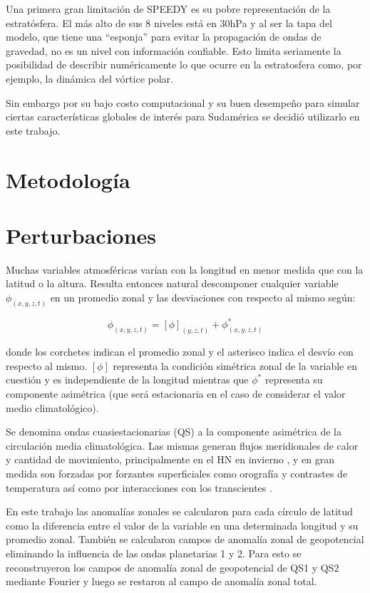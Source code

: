\documentclass[spanish,a4paper,12pt,oneside]{book}
\begin{document}
Una primera gran limitación de SPEEDY es su pobre representación de la
estratósfera. El más alto de sus 8 niveles está en 30hPa y al ser la
tapa del modelo, que tiene una ``esponja'' para evitar la propagación de
ondas de gravedad, no es un nivel con información confiable. Esto limita
seriamente la posibilidad de describir numéricamente lo que ocurre en la
estratosfera como, por ejemplo, la dinámica del vórtice polar.

Sin embargo por su bajo costo computacional y su buen desempeño para
simular ciertas características globales de interés para Sudamérica
\citep{Barreiro2014} se decidió utilizarlo en este trabajo.

\section{Metodología}\label{metodologia}

\section*{Perturbaciones}

Muchas variables atmosféricas varían con la longitud en menor medida que
con la latitud o la altura. Resulta entonces natural descomponer
cualquier variable \(\phi_{(x, y, z, t)}\) en un promedio zonal y las
desviaciones con respecto al mismo según:

\[
\phi_{(x, y, z, t)} = [\phi]_{(y, z, t)} + \phi_{(x, y, z, t)}^*
\]

donde los corchetes indican el promedio zonal y el asterisco indica el
desvío con respecto al mismo. \([\phi]\) representa la condición
simétrica zonal de la variable en cuestión y es independiente de la
longitud mientras que \(\phi^*\) representa su componente asimétrica
(que será estacionaria en el caso de considerar el valor medio
climatológico).

Se denomina ondas cuasiestacionarias (QS) a la componente asimétrica de
la circulación media climatológica. Las mismas generan flujos
meridionales de calor y cantidad de movimiento, principalmente en el HN
en invierno \citep{James}, y en gran medida son forzadas por forzantes
superficiales como orografía y contrastes de temperatura así como por
interacciones con los transcientes \citep{Rao2004}.

En este trabajo las anomalías zonales se calcularon para cada círculo de
latitud como la diferencia entre el valor de la variable en una
determinada longitud y su promedio zonal. También se calcularon campos
de anomalía zonal de geopotencial eliminando la influencia de las ondas
planetarias 1 y 2. Para esto se reconstruyeron los campos de anomalía
zonal de geopotencial de QS1 y QS2 mediante Fourier y luego se restaron
al campo de anomalía zonal total.
\end{document}
